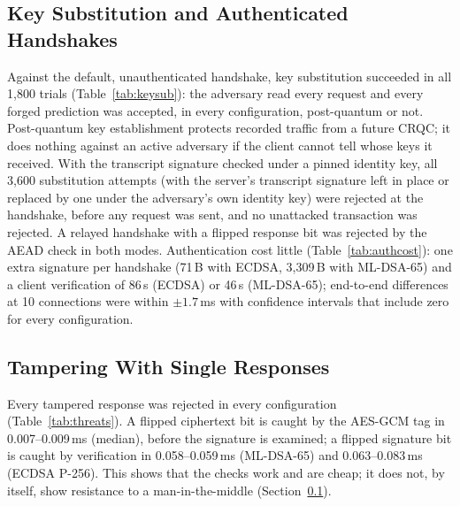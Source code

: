 \documentclass[conference]{IEEEtran}
\begin{document}


\subsection{Key Substitution and Authenticated Handshakes}\label{sec:res-keysub}
Against the default, unauthenticated handshake, key substitution succeeded in all 1,800 trials
(Table~\ref{tab:keysub}): the adversary read every request and every forged prediction was accepted, in
every configuration, post-quantum or not. Post-quantum key establishment protects recorded traffic from
a future CRQC; it does nothing against an active adversary if the client cannot tell whose keys it
received. With the transcript signature checked under a pinned identity key, all 3,600 substitution
attempts (with the server's transcript signature left in place or replaced by one under the adversary's
own identity key) were rejected at the handshake, before any request was sent, and no unattacked
transaction was rejected. A relayed handshake with a flipped response bit was rejected by the AEAD check
in both modes. Authentication cost little (Table~\ref{tab:authcost}): one extra signature per handshake
(71\,B with ECDSA, 3,309\,B with ML-DSA-65) and a client verification of 86\,\textmu s (ECDSA) or
46\,\textmu s (ML-DSA-65); end-to-end differences at 10 connections were within $\pm1.7$\,ms with
confidence intervals that include zero for every configuration.





\subsection{Tampering With Single Responses}\label{sec:res-mitm}
Every tampered response was rejected in every configuration (Table~\ref{tab:threats}). A flipped
ciphertext bit is caught by the AES-GCM tag in 0.007--0.009\,ms (median), before the signature is
examined; a flipped signature bit is caught by verification in 0.058--0.059\,ms (ML-DSA-65) and
0.063--0.083\,ms (ECDSA P-256). This shows that the checks work and are cheap; it does not, by itself,
show resistance to a man-in-the-middle (Section~\ref{sec:res-keysub}).


\end{document}
